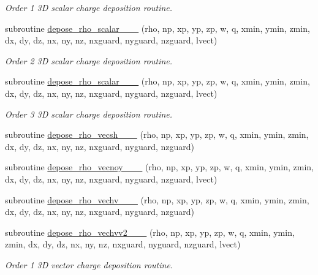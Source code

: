\begin{DoxyCompactItemize}
\begin{DoxyCompactList}\small\item\em Order 1 3D scalar charge deposition routine. \end{DoxyCompactList}\item 
subroutine \hyperlink{charge__deposition_8_f90_a38e265fb630353694edfd86592922c74}{depose\+\_\+rho\+\_\+scalar\+\_\+\_\+\_} (rho, np, xp, yp, zp, w, q, xmin, ymin, zmin, dx, dy, dz, nx, ny, nz,                                   nxguard, nyguard, nzguard, lvect)
\begin{DoxyCompactList}\small\item\em Order 2 3D scalar charge deposition routine. \end{DoxyCompactList}\item 
subroutine \hyperlink{charge__deposition_8_f90_a7bc83de646747d60d464cd7bff59db9f}{depose\+\_\+rho\+\_\+scalar\+\_\+\_\+\_} (rho, np, xp, yp, zp, w, q, xmin, ymin, zmin, dx, dy, dz, nx, ny, nz,                                       nxguard, nyguard, nzguard, lvect)
\begin{DoxyCompactList}\small\item\em Order 3 3D scalar charge deposition routine. \end{DoxyCompactList}\item 
subroutine \hyperlink{charge__deposition_8_f90_af27f8c31c24d02ff56d5767f41c425cc}{depose\+\_\+rho\+\_\+vecsh\+\_\+\_\+\_} (rho, np, xp, yp, zp, w, q, xmin, ymin, zmin, dx, dy, dz, nx, ny, nz, nxguard, nyguard, nzguard)
\item 
subroutine \hyperlink{charge__deposition_8_f90_a570a05e74c2ed2a6fb9f9bf851e68390}{depose\+\_\+rho\+\_\+vecnoy\+\_\+\_\+\_} (rho, np, xp, yp, zp, w, q, xmin, ymin, zmin, dx, dy, dz, nx, ny, nz, nxguard, nyguard, nzguard, lvect)
\item 
subroutine \hyperlink{charge__deposition_8_f90_a9c1d09d89c39bd299a3b894dd419a9c6}{depose\+\_\+rho\+\_\+vechv\+\_\+\_\+\_} (rho, np, xp, yp, zp, w, q, xmin, ymin, zmin, dx, dy, dz, nx, ny, nz, nxguard, nyguard, nzguard)
\item 
subroutine \hyperlink{charge__deposition_8_f90_a8cd073a8fdaca9986ced5d11280777f6}{depose\+\_\+rho\+\_\+vechvv2\+\_\+\_\+\_} (rho, np, xp, yp, zp, w, q, xmin, ymin, zmin, dx, dy, dz, nx, ny, nz, nxguard, nyguard, nzguard, lvect)
\begin{DoxyCompactList}\small\item\em Order 1 3D vector charge deposition routine. \end{DoxyCompactList}\item 

\end{DoxyCompactItemize}
